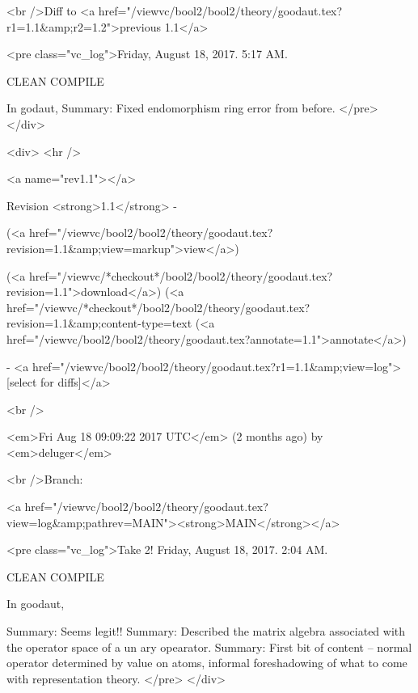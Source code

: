<br />Diff to <a href="/viewvc/bool2/bool2/theory/goodaut.tex?r1=1.1&amp;r2=1.2">previous 1.1</a>










<pre class="vc_log">Friday, August 18, 2017. 5:17 AM.

CLEAN COMPILE

In godaut,
Summary: Fixed endomorphism ring error from before.
</pre>
</div>



<div>
<hr />

<a name="rev1.1"></a>


Revision <strong>1.1</strong> -


(<a href="/viewvc/bool2/bool2/theory/goodaut.tex?revision=1.1&amp;view=markup">view</a>)


(<a href="/viewvc/*checkout*/bool2/bool2/theory/goodaut.tex?revision=1.1">download</a>)
(<a href="/viewvc/*checkout*/bool2/bool2/theory/goodaut.tex?revision=1.1&amp;content-type=text%
(<a href="/viewvc/bool2/bool2/theory/goodaut.tex?annotate=1.1">annotate</a>)



- <a href="/viewvc/bool2/bool2/theory/goodaut.tex?r1=1.1&amp;view=log">[select for diffs]</a>




<br />

<em>Fri Aug 18 09:09:22 2017 UTC</em>
(2 months ago)
by <em>deluger</em>


<br />Branch:

<a href="/viewvc/bool2/bool2/theory/goodaut.tex?view=log&amp;pathrev=MAIN"><strong>MAIN</strong></a>

















<pre class="vc_log">Take 2!
Friday, August 18, 2017.  2:04 AM.

CLEAN COMPILE

In goodaut,

Summary: Seems legit!!
Summary: Described the matrix algebra associated with the operator space of a un
ary opearator.
Summary: First bit of content -- normal  operator determined by value on atoms,
informal foreshadowing
of what to come with representation theory.
</pre>
</div>

